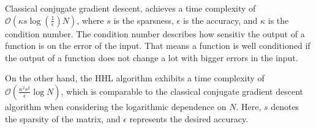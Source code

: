 Classical conjugate gradient descent, achieves a time complexity of $\mathcal{O}(\kappa s \log\left(\frac{1}{\epsilon}\right) N)$, where $s$ is the sparsness, $\epsilon$ is the accuracy, and $\kappa$ is the condition number.
The condition number describes how sensitiv the output of a function is on the error of the input.
That means a function is well conditioned if the output of a function does not change a lot with bigger errors in the input. 

On the other hand, the HHL algorithm exhibits a time complexity of $\mathcal{O}\left(\frac{\kappa^2s^2}{\epsilon}\log N\right)$, which is comparable to the classical conjugate gradient descent algorithm when considering the logarithmic dependence on $N$. 
Here, $s$ denotes the sparsity of the matrix, and $\epsilon$ represents the desired accuracy.
